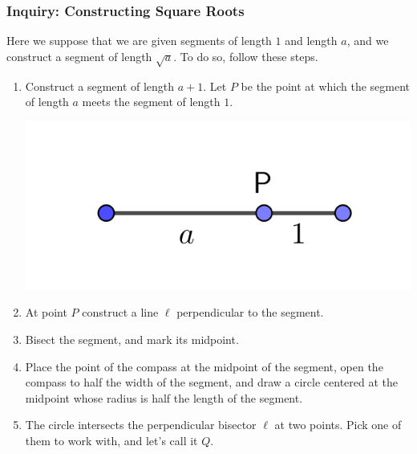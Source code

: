 \documentclass[11pt]{article}
\newenvironment{task}
	{\begin{mdframed}[linecolor=lightgray, linewidth=3pt]\raggedright}
	{\end{mdframed}}
\theoremstyle{definition}
\begin{document}
\subsubsection{Inquiry: Constructing Square Roots}

\begin{task}
  Here we suppose that we are given segments of length $1$ and length $a$, and we construct a segment of length $\sqrt{a}$. To do so, follow these
  steps.
  \begin{enumerate}
    \item Construct a segment of length $a+1$. Let $P$ be the point at which the segment of length $a$ meets the segment of length $1$.
  \begin{center}
    \includegraphics[scale=.75]{Images/square_roots_1.png}
  \end{center}
    \item At point $P$ construct a line $\ell$ perpendicular to the segment.
    \item Bisect the segment, and mark its midpoint.
    \item Place the point of the compass at the midpoint of the segment, open the compass to half the width of the segment, and draw a circle 
      centered at the midpoint whose radius is half the length of the segment.
    \item The circle intersects the perpendicular bisector $\ell$ at two points. Pick one of them to work with, and let's call it $Q$.
  \begin{center}

\end{center}
\end{enumerate}
\end{task}
\end{document}
